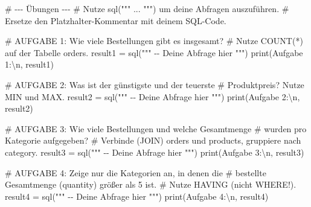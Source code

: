 \documentclass[
  nswissgerman,
  a4paper,
  DIV=11,
  numbers=noendperiod,
  ngerman]{scrreprt}
\newenvironment{Shaded}{\begin{snugshade}}{\end{snugshade}}
\newcommand{\BuiltInTok}[1]{\textcolor[rgb]{0.00,0.23,0.31}{#1}}
\newcommand{\CharTok}[1]{\textcolor[rgb]{0.13,0.47,0.30}{#1}}
\newcommand{\CommentTok}[1]{\textcolor[rgb]{0.37,0.37,0.37}{#1}}
\newcommand{\NormalTok}[1]{\textcolor[rgb]{0.00,0.23,0.31}{#1}}
\newcommand{\OperatorTok}[1]{\textcolor[rgb]{0.37,0.37,0.37}{#1}}
\newcommand{\StringTok}[1]{\textcolor[rgb]{0.13,0.47,0.30}{#1}}
\begin{document}
\begin{Shaded}
\begin{Highlighting}[numbers=left,,]
\CommentTok{\# {-}{-}{-} Übungen {-}{-}{-}}
\CommentTok{\# Nutze sql(""" ... """) um deine Abfragen auszuführen.}
\CommentTok{\# Ersetze den Platzhalter{-}Kommentar mit deinem SQL{-}Code.}

\CommentTok{\# AUFGABE 1: Wie viele Bestellungen gibt es insgesamt?}
\CommentTok{\# Nutze COUNT(*) auf der Tabelle \textquotesingle{}orders\textquotesingle{}.}
\NormalTok{result1 }\OperatorTok{=}\NormalTok{ sql(}\StringTok{"""}
\StringTok{{-}{-} Deine Abfrage hier}
\StringTok{"""}\NormalTok{)}
\BuiltInTok{print}\NormalTok{(}\StringTok{\textquotesingle{}Aufgabe 1:}\CharTok{\textbackslash{}n}\StringTok{\textquotesingle{}}\NormalTok{, result1)}
\end{Highlighting}
\end{Shaded}

\begin{Shaded}
\begin{Highlighting}[numbers=left,,]
\CommentTok{\# AUFGABE 2: Was ist der günstigste und der teuerste}
\CommentTok{\# Produktpreis? Nutze MIN und MAX.}
\NormalTok{result2 }\OperatorTok{=}\NormalTok{ sql(}\StringTok{"""}
\StringTok{{-}{-} Deine Abfrage hier              }
\StringTok{"""}\NormalTok{)}
\BuiltInTok{print}\NormalTok{(}\StringTok{\textquotesingle{}Aufgabe 2:}\CharTok{\textbackslash{}n}\StringTok{\textquotesingle{}}\NormalTok{, result2)}
\end{Highlighting}
\end{Shaded}

\begin{Shaded}
\begin{Highlighting}[numbers=left,,]
\CommentTok{\# AUFGABE 3: Wie viele Bestellungen und welche Gesamtmenge}
\CommentTok{\# wurden pro Kategorie aufgegeben?}
\CommentTok{\# Verbinde (JOIN) \textquotesingle{}orders\textquotesingle{} und \textquotesingle{}products\textquotesingle{}, gruppiere nach \textquotesingle{}category\textquotesingle{}.}
\NormalTok{result3 }\OperatorTok{=}\NormalTok{ sql(}\StringTok{"""}
\StringTok{{-}{-} Deine Abfrage hier}
\StringTok{"""}\NormalTok{)}
\BuiltInTok{print}\NormalTok{(}\StringTok{\textquotesingle{}Aufgabe 3:}\CharTok{\textbackslash{}n}\StringTok{\textquotesingle{}}\NormalTok{, result3)}
\end{Highlighting}
\end{Shaded}

\begin{Shaded}
\begin{Highlighting}[numbers=left,,]
\CommentTok{\# AUFGABE 4: Zeige nur die Kategorien an, in denen die}
\CommentTok{\# bestellte Gesamtmenge (quantity) größer als 5 ist.}
\CommentTok{\# Nutze HAVING (nicht WHERE!).}
\NormalTok{result4 }\OperatorTok{=}\NormalTok{ sql(}\StringTok{"""}
\StringTok{{-}{-} Deine Abfrage hier}
\StringTok{"""}\NormalTok{)}
\BuiltInTok{print}\NormalTok{(}\StringTok{\textquotesingle{}Aufgabe 4:}\CharTok{\textbackslash{}n}\StringTok{\textquotesingle{}}\NormalTok{, result4)}
\end{Highlighting}
\end{Shaded}
\end{document}
